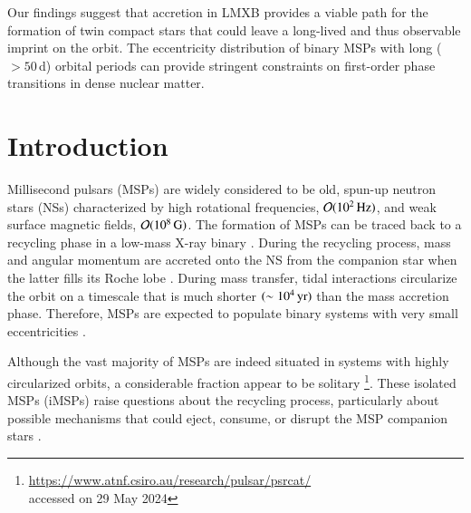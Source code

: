 \documentclass[main.tex]{subfiles}
\begin{document}
    Our findings suggest that accretion in LMXB provides a viable path for the formation of twin compact stars that could leave a long-lived and thus observable imprint on the orbit. The eccentricity distribution of binary MSPs with long ($>50\,$d) orbital periods can provide stringent constraints on first-order phase transitions in dense nuclear matter.
    
    {
        \minitoc
        \newpage
    }
    
    \section{Introduction} \label{sec:ch4:intro}
    Millisecond pulsars (MSPs) are widely considered to be old, spun-up neutron stars (NSs) characterized by high rotational frequencies, $\mathcal{O}(10^2\,\rm Hz)$, and weak surface magnetic fields, $\mathcal{O}(10^8\,\rm G)$. The formation of MSPs can be traced back to a recycling
    phase in a low-mass X-ray binary \citep[LMXB; see][]{Tauris:2023nmj}. 
    During the recycling process,  mass and angular momentum are accreted onto the NS from the companion star when the latter fills its Roche lobe \citep[e.g.,][and references therein]{Bhattacharya:1991pre, Tauris:aap1999, Tauris:2023nmj}. During mass transfer,  tidal interactions circularize the orbit on a timescale that is much shorter $(\sim 10^4\,\rm yr)$ than the  mass accretion phase. Therefore, MSPs are expected to populate binary systems with very small eccentricities \citep{Phinney:1992, Verbunt:aa1995}.
    
    Although the vast majority of MSPs are indeed situated in systems with highly circularized orbits, a considerable fraction  appear to be solitary \citep[$\sim 27$\% among known MSPs with spin periods $\leq 30$\,ms; see the ATNF pulsar catalogue;][]{Manchester_2005}\footnote{\url{https://www.atnf.csiro.au/research/pulsar/psrcat/}\\ accessed on 29 May 2024}. These isolated MSPs (iMSPs) raise questions about the recycling process, particularly about possible mechanisms that could eject, consume, or disrupt the MSP companion stars \citep{1987Natur.329..312V, 2019PASA...36....5S, 2019JApA...40...32N, 2020A&A...633A..45J, antoniadis:2021}. 
    
\end{document}

